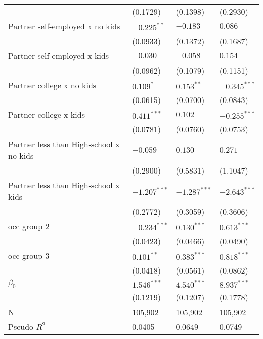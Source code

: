 \begin{tabular}{llll}
                                        &           (0.1729) &           (0.1398) &           (0.2930) \\
Partner self-employed x no kids         &      $-0.225^{**}$ &           $-0.183$ &            $0.086$ \\
                                        &           (0.0933) &           (0.1372) &           (0.1687) \\
Partner self-employed x kids            &           $-0.030$ &           $-0.058$ &            $0.154$ \\
                                        &           (0.0962) &           (0.1079) &           (0.1151) \\
Partner college x no kids               &          $0.109^*$ &       $0.153^{**}$ &     $-0.345^{***}$ \\
                                        &           (0.0615) &           (0.0700) &           (0.0843) \\
Partner college x kids                  &      $0.411^{***}$ &            $0.102$ &     $-0.255^{***}$ \\
                                        &           (0.0781) &           (0.0760) &           (0.0753) \\
Partner less than High-school x no kids &           $-0.059$ &            $0.130$ &            $0.271$ \\
                                        &           (0.2900) &           (0.5831) &           (1.1047) \\
Partner less than High-school x kids    &     $-1.207^{***}$ &     $-1.287^{***}$ &     $-2.643^{***}$ \\
                                        &           (0.2772) &           (0.3059) &           (0.3606) \\
occ group 2                             &     $-0.234^{***}$ &      $0.130^{***}$ &      $0.613^{***}$ \\
                                        &           (0.0423) &           (0.0466) &           (0.0490) \\
occ group 3                             &       $0.101^{**}$ &      $0.383^{***}$ &      $0.818^{***}$ \\
                                        &           (0.0418) &           (0.0561) &           (0.0862) \\
$\beta_0$                               &      $1.546^{***}$ &      $4.540^{***}$ &      $8.937^{***}$ \\
                                        &           (0.1219) &           (0.1207) &           (0.1778) \\
N                                       &            105,902 &            105,902 &            105,902 \\
Pseudo $R^2$                            &             0.0405 &             0.0649 &             0.0749 \\
\bottomrule
\end{tabular}
